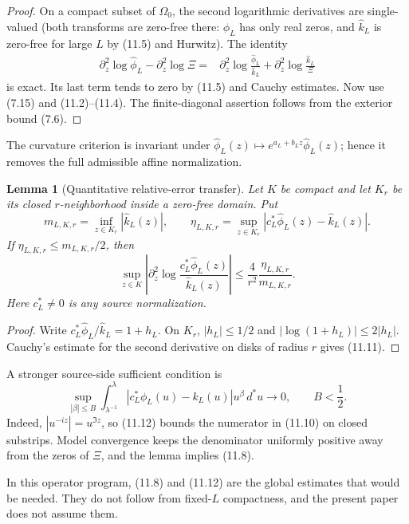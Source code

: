 \documentclass[11pt]{amsart}
\newtheorem{lemma}[theorem]{Lemma}
\theoremstyle{definition}
\theoremstyle{remark}
\newcommand{\XiR}{\Xi}
\begin{document}
\begin{proof}
On a compact subset of \(\Omega_0\), the second logarithmic derivatives
are single-valued (both transforms are zero-free there: \(\widehat\phi_L\)
has only real zeros, and \(\widehat k_L\) is zero-free for large \(L\) by
\textup{(11.5)} and Hurwitz).  The identity
\[
\begin{aligned}
 \partial_z^2\log\widehat\phi_L-\partial_z^2\log\XiR
={}&\partial_z^2\log\frac{\widehat\phi_L}{\widehat k_L}
 +\partial_z^2\log\frac{\widehat k_L}{\XiR}
\end{aligned}
\tag{11.9}
\]
is exact.  Its last term tends to zero by (11.5) and Cauchy estimates.
Now use (7.15) and (11.2)--(11.4).  The finite-diagonal assertion follows
from the exterior bound (7.6).
\end{proof}

The curvature criterion is invariant under
\(\widehat\phi_L(z)\mapsto e^{a_L+b_Lz}\widehat\phi_L(z)\); hence it removes
the full admissible affine normalization.

\begin{lemma}[Quantitative relative-error transfer]
Let \(K\) be compact and let \(K_r\) be its closed \(r\)-neighborhood
inside a zero-free domain.  Put
\[
 m_{L,K,r}=\inf_{z\in K_r}|\widehat k_L(z)|,
 \qquad
 \eta_{L,K,r}=\sup_{z\in K_r}
 |c_L^*\widehat\phi_L(z)-\widehat k_L(z)|.
\tag{11.10}
\]
If \(\eta_{L,K,r}\le m_{L,K,r}/2\), then
\[
\boxed{
 \sup_{z\in K}\left|
 \partial_z^2\log\frac{c_L^*\widehat\phi_L(z)}{\widehat k_L(z)}
 \right|
 \le\frac4{r^2}\frac{\eta_{L,K,r}}{m_{L,K,r}}.}
\tag{11.11}
\]
Here \(c_L^*\ne0\) is any source normalization.
\end{lemma}

\begin{proof}
Write \(c_L^*\widehat\phi_L/\widehat k_L=1+h_L\).  On \(K_r\),
\(|h_L|\le1/2\) and \(|\log(1+h_L)|\le2|h_L|\).  Cauchy's estimate for
the second derivative on disks of radius \(r\) gives (11.11).
\end{proof}

A stronger source-side sufficient condition is
\[
 \sup_{|\beta|\le B}
 \int_{\lambda^{-1}}^\lambda
 |c_L^*\phi_L(u)-k_L(u)|u^\beta\,d^*u
 \longrightarrow0,
 \qquad B<\frac12.
\tag{11.12}
\]
Indeed, \(|u^{-iz}|=u^{\Im z}\), so (11.12) bounds the numerator in
(11.10) on closed substrips.  Model convergence keeps the denominator
uniformly positive away from the zeros of \(\XiR\), and the lemma implies
(11.8).

In this operator program, (11.8) and (11.12) are the global estimates
that would be needed.  They do not follow
from fixed-\(L\) compactness, and the present paper does not assume them.
\end{document}
